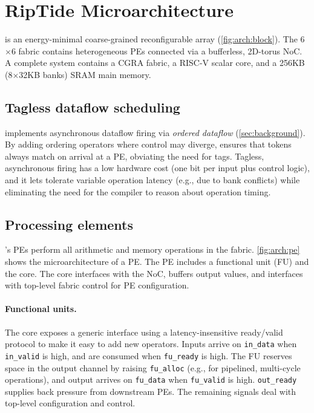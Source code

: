 \section{RipTide Microarchitecture}
\label{sec:arch}

\riptide is an energy-minimal coarse-grained reconfigurable array (\autoref{fig:arch:block}).
% 
The 6$\times$6 fabric contains
heterogeneous PEs connected via a bufferless, 2D-torus NoC.
% 
A complete \riptide system contains a CGRA fabric, a RISC-V scalar core, and a 256KB
(8$\times$32KB banks) SRAM main memory.

\subsection{Tagless dataflow scheduling}

\riptide implements asynchronous dataflow firing via \emph{ordered dataflow} (\autoref{sec:background}).
%
By adding ordering operators where control may diverge,
%
\riptide ensures that tokens always match on arrival at a PE, obviating the need for tags.
%
Tagless, asynchronous firing has a low hardware cost (one bit per input plus
control logic),
%
and it lets \riptide tolerate variable operation latency
(e.g., due to bank conflicts) while eliminating the need for the compiler to reason about
operation timing.

\subsection{Processing elements}
\riptide's PEs perform all arithmetic and memory operations in the fabric.
%
\autoref{fig:arch:pe} shows the microarchitecture of a PE.
% 
The PE includes a functional unit (FU) and the \textmu core.
% 
The \textmu core interfaces with the NoC, buffers
output values, and interfaces with top-level fabric control for PE configuration.

\paragraph{Functional units.}
The \textmu core exposes a generic interface using a
latency-insensitive ready/valid protocol to make it easy to add new
operators.
%
Inputs arrive on {\tt in\_data} when {\tt in\_valid} is high,
and are consumed when {\tt fu\_ready} is high.
%
The FU reserves space in the output channel by raising {\tt fu\_alloc}
(e.g., for pipelined, multi-cycle operations),
and output arrives on {\tt fu\_data} when {\tt fu\_valid} is high.
%
{\tt out\_ready} supplies back pressure from downstream PEs.
%
The remaining signals deal with top-level configuration and control.

